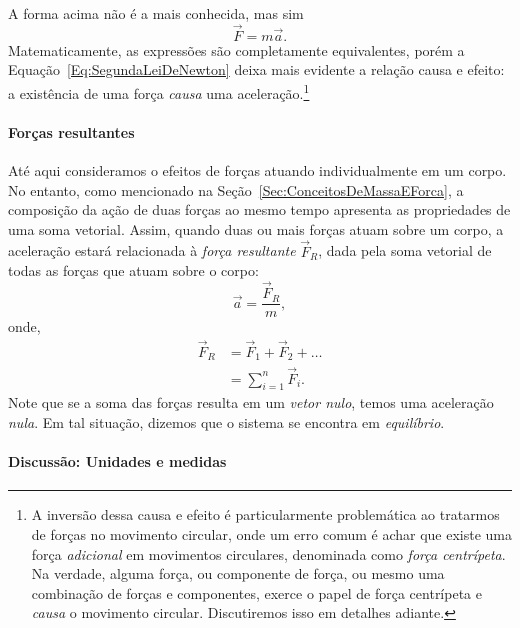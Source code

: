 A forma acima não é a mais conhecida, mas sim 
\begin{equation}
  \vec{F} = m \vec{a}.
\end{equation}
%
Matematicamente, as expressões são completamente equivalentes, porém a Equação~\ref{Eq:SegundaLeiDeNewton} deixa mais evidente a relação causa e efeito: a existência de uma força \emph{causa} uma aceleração.\footnote{A inversão dessa causa e efeito é particularmente problemática ao tratarmos de forças no movimento circular, onde um erro comum é achar que existe uma força \emph{adicional} em movimentos circulares, denominada como \emph{força centrípeta}. Na verdade, alguma força, ou componente de força, ou mesmo uma combinação de forças e componentes, exerce o papel de força centrípeta e \emph{causa} o movimento circular. Discutiremos isso em detalhes adiante.}

\paragraph{Forças resultantes}

Até aqui consideramos o efeitos de forças atuando individualmente em um corpo. No entanto, como mencionado na Seção~\ref{Sec:ConceitosDeMassaEForca}, a composição da ação de duas forças ao mesmo tempo apresenta as propriedades de uma soma vetorial. Assim, quando duas ou mais forças atuam sobre um corpo, a aceleração estará relacionada à \emph{força resultante} $\vec{F}_R$, dada pela soma vetorial de todas as forças que atuam sobre o corpo:
\begin{equation}
    \vec{a} =\frac{\vec{F}_R}{m},
\end{equation}
%
onde,
\begin{align}
    \vec{F}_R &= \vec{F}_1 + \vec{F}_2 + \dots \\
    &= \sum_{i = 1}^n \vec{F}_i.
\end{align}
%
Note que se a soma das forças resulta em um \emph{vetor nulo}, temos uma aceleração \emph{nula}. Em tal situação, dizemos que o sistema se encontra em \emph{equilíbrio}.

\paragraph{Discussão: Unidades e medidas}

